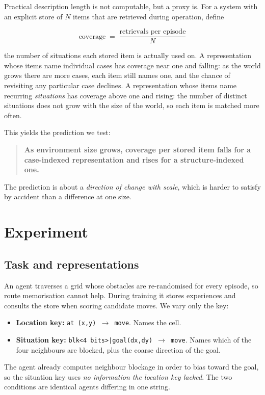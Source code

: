 \documentclass[11pt]{article}
\begin{document}
Practical description length is not computable, but a proxy is. For a system
with an explicit store of $N$ items that are retrieved during operation, define

\[
\text{coverage} \;=\; \frac{\text{retrievals per episode}}{N}
\]

the number of situations each stored item is actually used on. A representation
whose items name individual cases has coverage near one and falling: as the
world grows there are more cases, each item still names one, and the chance of
revisiting any particular case declines. A representation whose items name
recurring \emph{situations} has coverage above one and rising: the number of
distinct situations does not grow with the size of the world, so each item is
matched more often.

This yields the prediction we test:

\begin{quote}
\textbf{As environment size grows, coverage per stored item falls for a
case-indexed representation and rises for a structure-indexed one.}
\end{quote}

The prediction is about a \emph{direction of change with scale}, which is
harder to satisfy by accident than a difference at one size.

\section{Experiment}

\subsection{Task and representations}

An agent traverses a grid whose obstacles are re-randomised for every episode,
so route memorisation cannot help. During training it stores experiences and
consults the store when scoring candidate moves. We vary only the key:

\begin{itemize}\itemsep1pt
\item \textbf{Location key:} \texttt{at (x,y) $\to$ move}. Names the cell.
\item \textbf{Situation key:} \texttt{blk<4 bits>|goal(dx,dy) $\to$ move}. Names
which of the four neighbours are blocked, plus the coarse direction of the
goal.
\end{itemize}

The agent already computes neighbour blockage in order to bias toward the goal,
so the situation key uses \emph{no information the location key lacked}. The
two conditions are identical agents differing in one string.
\end{document}
